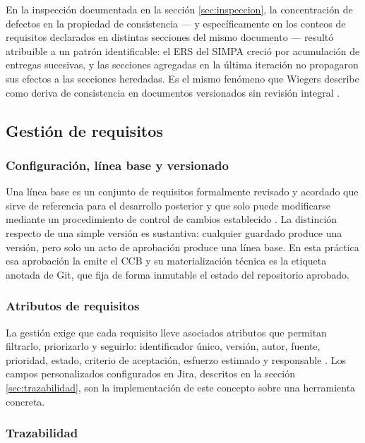 \documentclass[11pt,letterpaper]{article}
\begin{document}
En la inspección documentada en la sección \ref{sec:inspeccion}, la concentración de defectos en la
propiedad de consistencia --- y específicamente en los conteos de requisitos declarados en distintas
secciones del mismo documento --- resultó atribuible a un patrón identificable: el ERS del SIMPA
creció por acumulación de entregas sucesivas, y las secciones agregadas en la última iteración no
propagaron sus efectos a las secciones heredadas. Es el mismo fenómeno que Wiegers describe como
deriva de consistencia en documentos versionados sin revisión integral \cite{wiegers2013}.

\subsection{Gestión de requisitos}

\subsubsection*{Configuración, línea base y versionado}

Una línea base es un conjunto de requisitos formalmente revisado y acordado que sirve de referencia
para el desarrollo posterior y que solo puede modificarse mediante un procedimiento de control de
cambios establecido \cite{iso12207, wiegers2013}. La distinción respecto de una simple versión es
sustantiva: cualquier guardado produce una versión, pero solo un acto de aprobación produce una
línea base. En esta práctica esa aprobación la emite el CCB y su materialización técnica es la
etiqueta anotada de Git, que fija de forma inmutable el estado del repositorio aprobado.

\subsubsection*{Atributos de requisitos}

La gestión exige que cada requisito lleve asociados atributos que permitan filtrarlo, priorizarlo y
seguirlo: identificador único, versión, autor, fuente, prioridad, estado, criterio de aceptación,
esfuerzo estimado y responsable \cite{iso29148, wiegers2013}. Los campos personalizados configurados
en Jira, descritos en la sección \ref{sec:trazabilidad}, son la implementación de este concepto sobre
una herramienta concreta.

\subsubsection*{Trazabilidad}
\end{document}
